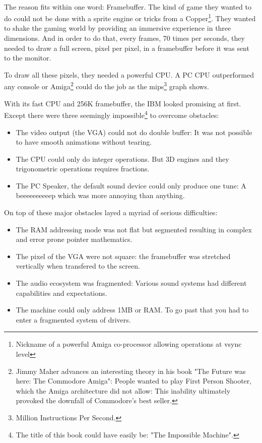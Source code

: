 \\
The reason fits within one word: Framebuffer. The kind of game they wanted to do could not be done with a sprite engine or tricks from a Copper\footnote{Nickname of a powerful Amiga co-processor allowing operations at vsync level}. They wanted to shake the gaming world by providing an immersive experience in three dimensions. And in order to do that, every frames, 70 times per seconds, they needed to draw a full screen, pixel per pixel, in a framebuffer before it was sent to the monitor. \\
\par
To draw all these pixels, they needed a powerful CPU. A PC CPU outperformed any console or Amiga\footnote{Jimmy Maher advances an interesting theory in his book "The Future was here: The Commodore Amiga": People wanted to play First Person Shooter, which the Amiga architecture did not allow: This inability ultimately provoked the downfall of Commodore's best seller.} could do the job as the mips\footnote{Million Instructions Per Second.} graph shows.
\par


 
With its fast CPU and 256K framebuffer, the IBM looked promising at first. Except there were three seemingly impossible\footnote{The title of this book could have easily be: "The Impossible Machine".} to overcome obstacles:\\
\begin{itemize}
\item The video output (the VGA) could not do double buffer: It was not possible to have smooth animations without tearing.
\item The CPU could only do integer operations. But 3D engines and they trigonometric operations requires fractions.
\item The PC Speaker, the default sound device could only produce one tune: A beeeeeeeeeep which was more annoying than anything.
\end{itemize}
On top of these major obstacles layed a myriad of serious difficulties:\\
\begin{itemize}
\item The RAM addressing mode was not flat but segmented resulting in complex and error prone pointer mathematics.
\item The pixel of the VGA were not square: the framebuffer was stretched vertically when transfered to the screen.
\item The audio ecosystem was fragmented: Various sound systems had different capabilities and expectations.
\item The machine could only address 1MB or RAM. To go past that you had to enter a fragmented system of drivers.
\end{itemize}

